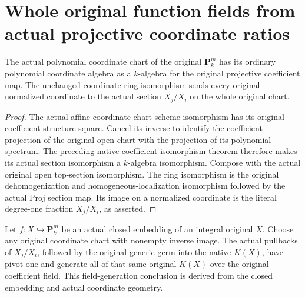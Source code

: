 \section{Whole original function fields from actual projective coordinate ratios}
\label{sec:projective-chart-function-field-generation}

\begin{theorem}
\label{thm:projective-chart-coefficient-algebra}
\leanok
{}
The actual polynomial coordinate chart of the original
$\mathbf P^m_k$ has its ordinary polynomial coordinate algebra
as a $k$-algebra for the original projective coefficient map.
The unchanged coordinate-ring isomorphism sends every original
normalized coordinate to the actual section $X_j/X_i$ on the
whole original chart.
\end{theorem}

\begin{proof}
The actual affine coordinate-chart scheme isomorphism has its
original coefficient structure square. Cancel its inverse to
identify the coefficient projection of the original open chart
with the projection of its polynomial spectrum. The preceding
native coefficient-isomorphism theorem therefore makes its
actual section isomorphism a $k$-algebra isomorphism. Compose
with the actual original open top-section isomorphism.
The ring isomorphism is the original dehomogenization and
homogeneous-localization isomorphism followed by the actual
Proj section map. Its image on a normalized coordinate is the
literal degree-one fraction $X_j/X_i$, as asserted.
\end{proof}

\begin{theorem}
\label{thm:projective-chart-function-field-generation}
\leanok
{}
Let $f:X\hookrightarrow\mathbf P^m_k$ be an actual closed
embedding of an integral original $X$. Choose any original
coordinate chart with nonempty inverse image. The actual
pullbacks of $X_j/X_i$, followed by the original generic
germ into the native $K(X)$, have pivot one and generate all
of that same original $K(X)$ over the original coefficient
field. This field-generation conclusion is derived from the
closed embedding and actual coordinate geometry.
\end{theorem}

